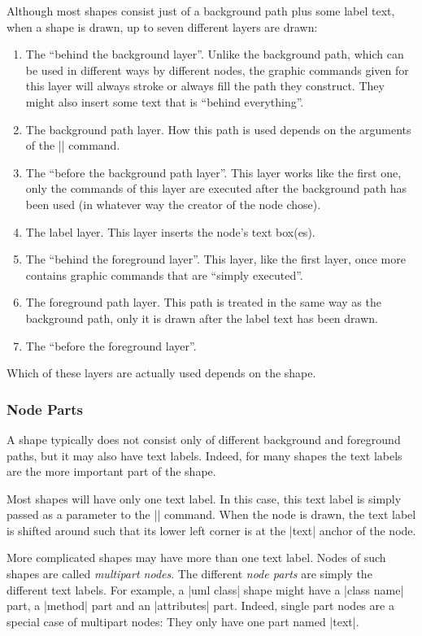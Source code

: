 Although most shapes consist just of a background path plus some label text,
when a shape is drawn, up to seven different layers are drawn:
%
\begin{enumerate}
    \item The ``behind the background layer''. Unlike the background path,
        which can be used in different ways by different nodes, the graphic
        commands given for this layer will always stroke or always fill the
        path they construct. They might also insert some text that is ``behind
        everything''.
    \item The background path layer. How this path is used depends on the
        arguments of the |\pgfnode| command.
    \item The ``before the background path layer''. This layer works like the
        first one, only the commands of this layer are executed after the
        background path has been used (in whatever way the creator of the node
        chose).
    \item The label layer. This layer inserts the node's text box(es).
    \item The ``behind the foreground layer''. This layer, like the first
        layer, once more contains graphic commands that are ``simply
        executed''.
    \item The foreground path layer. This path is treated in the same way as
        the background path, only it is drawn after the label text has been
        drawn.
    \item The ``before the foreground layer''.
\end{enumerate}

Which of these layers are actually used depends on the shape.


\subsubsection{Node Parts}

A shape typically does not consist only of different background and foreground
paths, but it may also have text labels. Indeed, for many shapes the text
labels are the more important part of the shape.

Most shapes will have only one text label. In this case, this text label is
simply passed as a parameter to the |\pgfnode| command. When the node is drawn,
the text label is shifted around such that its lower left corner is at the
|text| anchor of the node.

More complicated shapes may have more than one text label. Nodes of such shapes
are called \emph{multipart nodes}. The different \emph{node parts} are simply
the different text labels. For example, a |uml class| shape might have a
|class name| part, a |method| part and an |attributes| part. Indeed, single
part nodes are a special case of multipart nodes: They only have one part named
|text|.

